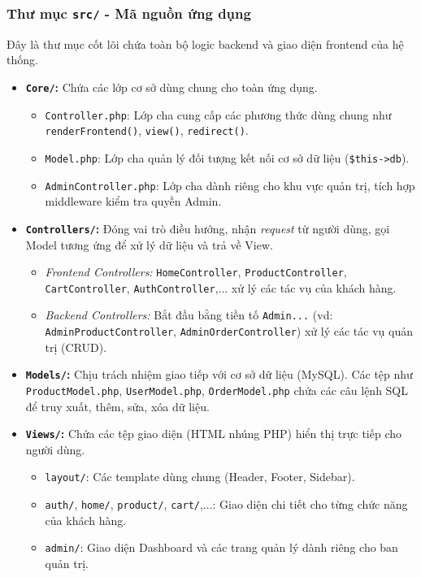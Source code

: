 \subsubsection{Thư mục \texttt{src/} - Mã nguồn ứng dụng}
Đây là thư mục cốt lõi chứa toàn bộ logic backend và giao diện frontend của hệ thống.
\begin{itemize}
    \item \textbf{\texttt{Core/}:} Chứa các lớp cơ sở dùng chung cho toàn ứng dụng.
    \begin{itemize}
        \item \texttt{Controller.php}: Lớp cha cung cấp các phương thức dùng chung như \texttt{renderFrontend()}, \texttt{view()}, \texttt{redirect()}.
        \item \texttt{Model.php}: Lớp cha quản lý đối tượng kết nối cơ sở dữ liệu (\texttt{\$this->db}).
        \item \texttt{AdminController.php}: Lớp cha dành riêng cho khu vực quản trị, tích hợp middleware kiểm tra quyền Admin.
    \end{itemize}
    
    \item \textbf{\texttt{Controllers/}:} Đóng vai trò điều hướng, nhận \textit{request} từ người dùng, gọi Model tương ứng để xử lý dữ liệu và trả về View.
    \begin{itemize}
        \item \textit{Frontend Controllers:} \texttt{HomeController}, \texttt{ProductController}, \texttt{CartController}, \texttt{AuthController},... xử lý các tác vụ của khách hàng.
        \item \textit{Backend Controllers:} Bắt đầu bằng tiền tố \texttt{Admin...} (vd: \texttt{AdminProductController}, \texttt{AdminOrderController}) xử lý các tác vụ quản trị (CRUD).
    \end{itemize}
    
    \item \textbf{\texttt{Models/}:} Chịu trách nhiệm giao tiếp với cơ sở dữ liệu (MySQL). Các tệp như \texttt{ProductModel.php}, \texttt{UserModel.php}, \texttt{OrderModel.php} chứa các câu lệnh SQL để truy xuất, thêm, sửa, xóa dữ liệu.
    
    \item \textbf{\texttt{Views/}:} Chứa các tệp giao diện (HTML nhúng PHP) hiển thị trực tiếp cho người dùng.
    \begin{itemize}
        \item \texttt{layout/}: Các template dùng chung (Header, Footer, Sidebar).
        \item \texttt{auth/}, \texttt{home/}, \texttt{product/}, \texttt{cart/},...: Giao diện chi tiết cho từng chức năng của khách hàng.
        \item \texttt{admin/}: Giao diện Dashboard và các trang quản lý dành riêng cho ban quản trị.
    \end{itemize}
\end{itemize}

